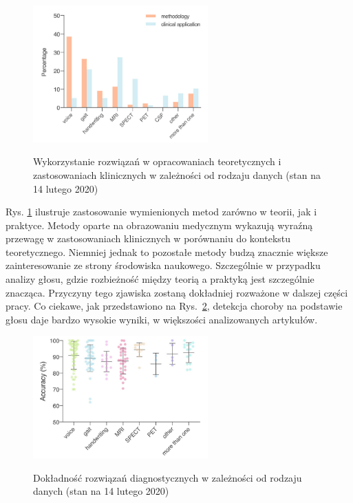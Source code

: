 \begin{figure}[htbp]
	\centering\includegraphics[width=0.6\textwidth]{./img/plot_PD_detection_methods}~\caption{Wykorzystanie rozwiązań w opracowaniach teoretycznych i zastosowaniach klinicznych w zależności od rodzaju danych (stan na 14 lutego 2020) \cite {ML_for_PD_review} }
    \label{fig:pd_detection_methods}
\end{figure}


Rys. \ref{fig:pd_detection_methods} ilustruje zastosowanie wymienionych metod zarówno w teorii, jak i praktyce.
Metody oparte na obrazowaniu medycznym wykazują wyraźną przewagę w zastosowaniach klinicznych w porównaniu do kontekstu teoretycznego.
Niemniej jednak to pozostałe metody budzą znacznie większe zainteresowanie ze strony środowiska naukowego.
Szczególnie w przypadku analizy głosu, gdzie rozbieżność między teorią a praktyką jest szczególnie znacząca.
Przyczyny tego zjawiska zostaną dokładniej rozważone w dalszej części pracy.
Co ciekawe, jak przedstawiono na Rys.~\ref{fig:pd_accuracy_methods}, detekcja choroby na podstawie głosu daje bardzo wysokie wyniki,
w większości analizowanych artykułów.

\begin{figure}[htbp]
	\centering
	\includegraphics[width=0.6\textwidth]{./img/accuracy}~\caption{Dokładność rozwiązań diagnostycznych w zależności od rodzaju danych (stan na 14 lutego 2020) \cite {ML_for_PD_review} }
    \label{fig:pd_accuracy_methods}
\end{figure}

